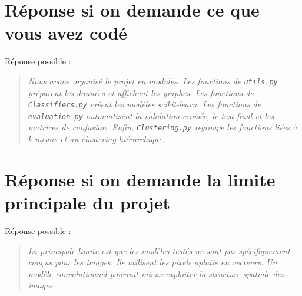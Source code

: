 \documentclass[11pt,a4paper]{article}
\begin{document}
\section{Réponse si on demande ce que vous avez codé}

Réponse possible :

\begin{quote}
\itshape Nous avons organisé le projet en modules. Les fonctions de \texttt{utils.py} préparent les données et affichent les graphes. Les fonctions de \texttt{Classifiers.py} créent les modèles scikit-learn. Les fonctions de \texttt{evaluation.py} automatisent la validation croisée, le test final et les matrices de confusion. Enfin, \texttt{Clustering.py} regroupe les fonctions liées à k-means et au clustering hiérarchique.
\end{quote}

\section{Réponse si on demande la limite principale du projet}

Réponse possible :

\begin{quote}
\itshape La principale limite est que les modèles testés ne sont pas spécifiquement conçus pour les images. Ils utilisent les pixels aplatis en vecteurs. Un modèle convolutionnel pourrait mieux exploiter la structure spatiale des images.
\end{quote}
\end{document}
